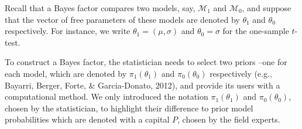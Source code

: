 \documentclass[english,,doc,floatsintext]{apa6}
\begin{document}
Recall that a Bayes factor compares two models, say, \(\mathcal{M}_{1}\) and \(\mathcal{M}_{0}\), and suppose that the vector of free parameters of these models are denoted by \(\theta_{1}\) and \(\theta_{0}\) respectively. For instance, we write \(\theta_{1} = ( \mu, \sigma)\) and \(\theta_{0} = \sigma\) for the one-sample \(t\)-test.

To construct a Bayes factor, the statistician needs to select two priors --one for each model, which are denoted by \(\pi_{1} (\theta_{1})\) and \(\pi_{0} (\theta_{0})\) respectively (e.g., Bayarri, Berger, Forte, \& Garcia-Donato, 2012), and provide its users with a computational method. We only introduced the notation \(\pi_{1} (\theta_{1})\) and \(\pi_{0} (\theta_{0})\), chosen by the statistician, to highlight their difference to prior model probabilities which are denoted with a capital \(P\), chosen by the field experts.
\end{document}
